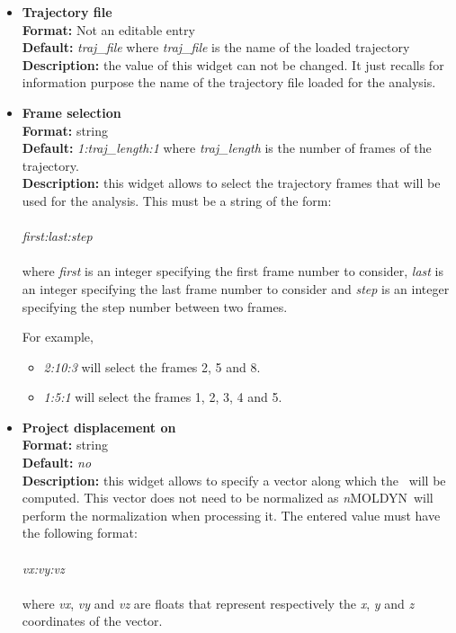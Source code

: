 \documentclass[a4paper,11pt]{report}
\newcommand{\NMOLDYN}{\textit{n}MOLDYN}
\begin{document}
\begin{itemize}
\item \textbf{Trajectory file}\\
\textbf{Format:} Not an editable entry\\
\textbf{Default:} \textit{traj\_file} where \textit{traj\_file} is the name of the loaded trajectory\\
\textbf{Description:} the value of this widget can not be changed. It just recalls for information purpose the name
of the trajectory file loaded for the analysis.

\item \textbf{Frame selection}\\
\textbf{Format:} string\\
\textbf{Default:} \textit{1:traj\_length:1} where \textit{traj\_length} is the number of frames of the trajectory.\\
\textbf{Description:} this widget allows to select the trajectory frames that will be used for the analysis. This must
be a string of the form:
\\\\
\textit{first:last:step}
\\\\
where \textit{first} is an integer specifying the first frame number to consider, \textit{last} is an integer specifying the last 
frame number to consider and \textit{step} is an integer specifying the step number between two frames.

For example,
\begin{itemize}
\item \textit{2:10:3} will select the frames 2, 5 and 8.
\item \textit{1:5:1} will select the frames 1, 2, 3, 4 and 5.
\end{itemize}

\item \textbf{Project displacement on}\\
\textbf{Format:} string\\
\textbf{Default:} \textit{no}\\
\textbf{Description:} this widget allows to specify a vector along which the \MSD\ will be computed. This vector does not 
need to be normalized as \NMOLDYN\ will perform the normalization when processing it. The entered value must have the 
following format:
\\\\
\textit{vx:vy:vz}
\\\\
where \textit{vx}, \textit{vy} and \textit{vz} are floats that represent respectively the \textit{x}, \textit{y} and \textit{z} coordinates of the vector.


\end{itemize}
\end{document}
